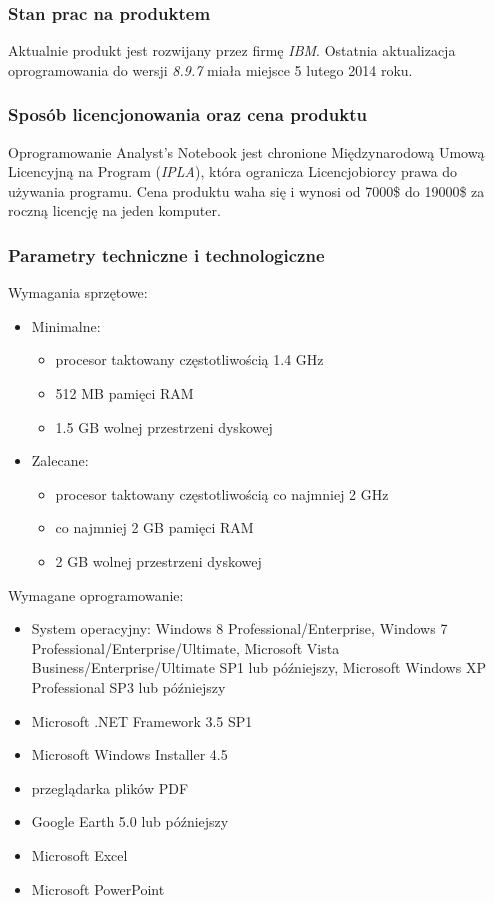 \documentclass[11pt,a4paper]{article}
\begin{document}
\subsubsection*{Stan prac na produktem}

Aktualnie produkt jest rozwijany przez firmę \emph{IBM}. Ostatnia aktualizacja oprogramowania do wersji \emph{8.9.7} miała miejsce 5 lutego 2014 roku.

\subsubsection*{Sposób licencjonowania oraz cena produktu}

Oprogramowanie Analyst's Notebook jest chronione Międzynarodową Umową Licencyjną na Program (\emph{IPLA}), która ogranicza Licencjobiorcy prawa do używania programu. Cena produktu waha się i wynosi od 7000\$ do 19000\$ za roczną licencję na jeden komputer.

\subsubsection*{Parametry techniczne i technologiczne}

Wymagania sprzętowe:
\begin{itemize}
	\item Minimalne:
		\begin{itemize}
			\item procesor taktowany częstotliwością 1.4 GHz
    		\item 512 MB pamięci RAM
    		\item 1.5 GB wolnej przestrzeni dyskowej
		\end{itemize}
	\item Zalecane: 
		\begin{itemize}
			\item procesor taktowany częstotliwością co najmniej 2 GHz
    		\item co najmniej 2 GB pamięci RAM
    		\item 2 GB wolnej przestrzeni dyskowej
		\end{itemize}
\end{itemize}

\raggedright{Wymagane oprogramowanie:}
\begin{itemize}
	\item System operacyjny: Windows 8 Professional/Enterprise, Windows 7 Professional/Enterprise/Ultimate, Microsoft Vista Business/Enterprise/Ultimate SP1 lub późniejszy, Microsoft Windows XP Professional SP3 lub późniejszy
	\item Microsoft .NET Framework 3.5 SP1
	\item Microsoft Windows Installer 4.5
	\item przeglądarka plików PDF
	\item Google Earth 5.0 lub późniejszy
	\item Microsoft Excel
	\item Microsoft PowerPoint
\end{itemize}
\end{document}
